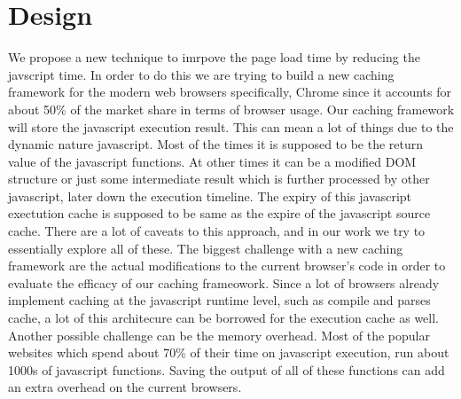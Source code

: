 \section{Design}
\label{sec:design}
We propose a new technique to imrpove the page load time by reducing
the javscript time.  In order to do this we are trying to build a new
caching framework for the modern web browsers specifically, Chrome
since it accounts for about 50\% of the market share in terms of
browser usage. Our caching framework will store the javascript
execution result. This can mean a lot of things due to the dynamic
nature javascript. Most of the times it is supposed to be the return
value of the javascript functions. At other times it can be a modified
DOM structure or just some intermediate result which is further
processed by other javascript, later down the execution timeline.  The
expiry of this javascript exectution cache is supposed to be same as
the expire of the javascript source cache.  There are a lot of caveats
to this approach, and in our work we try to essentially explore all of
these.  The biggest challenge with a new caching framework are the
actual modifications to the current browser's code in order to
evaluate the efficacy of our caching frameowork. Since a lot of
browsers already implement caching at the javascript runtime level,
such as compile and parses cache, a lot of this architecure can be
borrowed for the execution cache as well.  Another possible challenge
can be the memory overhead. Most of the popular websites which spend
about 70\% of their time on javascript execution, run about 1000s of
javascript functions. Saving the output of all of these functions can
add an extra overhead on the current browsers. 
